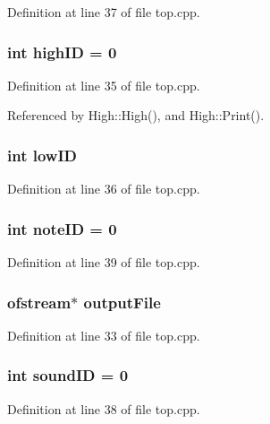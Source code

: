 Definition at line 37 of file top.cpp.
\subsubsection{\setlength{\rightskip}{0pt plus 5cm}int {\bf high\-ID} = 0}\label{top_8cpp_a1}




Definition at line 35 of file top.cpp.

Referenced by High::High(), and High::Print().
\subsubsection{\setlength{\rightskip}{0pt plus 5cm}int {\bf low\-ID}}\label{top_8cpp_a2}




Definition at line 36 of file top.cpp.
\subsubsection{\setlength{\rightskip}{0pt plus 5cm}int {\bf note\-ID} = 0}\label{top_8cpp_a5}




Definition at line 39 of file top.cpp.
\subsubsection{\setlength{\rightskip}{0pt plus 5cm}ofstream$\ast$ {\bf output\-File}}\label{top_8cpp_a0}




Definition at line 33 of file top.cpp.
\subsubsection{\setlength{\rightskip}{0pt plus 5cm}int {\bf sound\-ID} = 0}\label{top_8cpp_a4}




Definition at line 38 of file top.cpp.